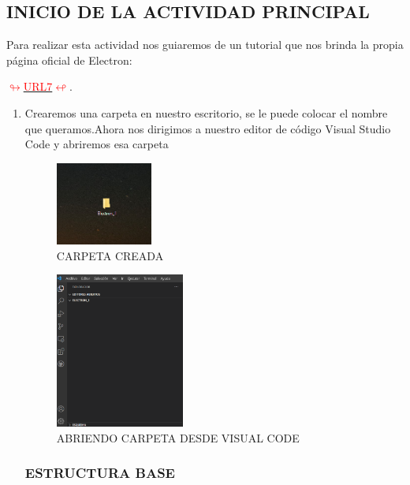  \subsection{INICIO DE LA ACTIVIDAD PRINCIPAL}
 
Para realizar esta actividad nos guiaremos de un tutorial que nos brinda la propia página oficial de Electron:
  \begin{minipage}[c]{0,17 \textwidth}
 \href{https://www.electronjs.org/docs/latest/tutorial/quick-start}{
 \def\svgwidth{0.9\textwidth}
 } 
 \end{minipage}\hyperlink{tutorial}{\textcolor{red}{$\looparrowright$URL7$\looparrowleft$}}.
\begin{enumerate}
    \item Crearemos una carpeta en nuestro escritorio, se le puede colocar el nombre que queramos.Ahora nos dirigimos a nuestro editor de código Visual Studio Code y abriremos esa carpeta
     \begin{figure}[H]
        \centering
        \includegraphics[width=0.3\textwidth]{img/electron0.png}
        \caption{CARPETA CREADA}
    \end{figure}
     \begin{figure}[H]
        \centering
        \includegraphics[width=0.4\textwidth]{img/electron1.png}
        \caption{ABRIENDO CARPETA DESDE VISUAL CODE}
    \end{figure}
     \subsubsection*{ESTRUCTURA BASE}
     

\end{enumerate}
